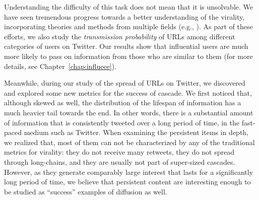 \documentclass[phd,tocprelim]{cornell}
\begin{document}
Understanding the difficulty of this task does not mean that it is unsolvable. We have seen tremendous progress towards a better understanding of the virality, incorporating theories and methods from multiple fields (e.g., \cite{Centola:2007, Bakshy-2011}). As part of these efforts, we also study the \emph{transmission probability} of URLs among different categories of users on Twitter. Our results show that influential users are much more likely to pass on information from those who are similar to them (for more details, see Chapter~\ref{chap:influece}).

Meanwhile, during our study of the spread of URLs on Twitter, we discovered and explored some new metrics for the success of cascade. We first noticed that,  although skewed as well, the distribution of the lifespan of information has a much heavier tail towards the end. In other words, there is a substantial amount of information that is consistently tweeted over a long period of time, in the fast-paced medium such as Twitter. When examining the persistent items in depth, we realized that, most of them can not be characterized by any of the traditional metrics for virality: they do not receive many retweets, they do not spread through long-chains, and they are usually not part of super-sized cascades. However, as they generate comparably large interest that lasts for a significantly long period of time, we believe that persistent content are interesting enough to be studied as ``success'' examples of diffusion as well.
\end{document}
